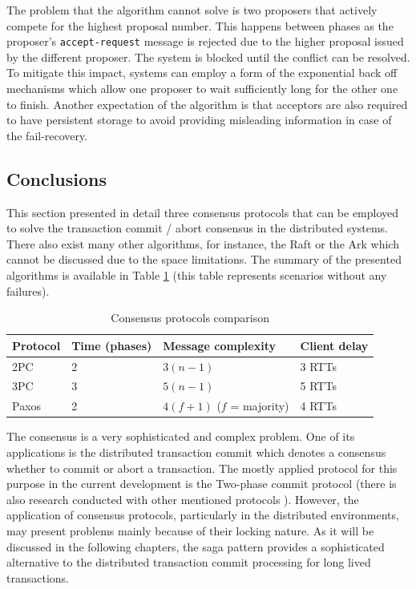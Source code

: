 \documentclass[oneside,
  digital, %
  table,   %
  lof,     %
  lot,     %
]{fithesis3}
\begin{document}
The problem that the algorithm cannot solve is two proposers that actively compete for the highest proposal number. This happens between phases as the proposer's \texttt{accept-request} message is rejected due to the higher proposal issued by the different proposer. The system is blocked until the conflict can be resolved. To mitigate this impact, systems can employ a form of the exponential back off mechanisms which allow one proposer to wait sufficiently long for the other one to finish. Another expectation of the algorithm is that acceptors are also required to have persistent storage to avoid providing misleading information in case of the fail-recovery.

\subsection{Conclusions}

This section presented in detail three consensus protocols that can be employed to solve the transaction commit / abort consensus in the distributed systems. There also exist many other algorithms, for instance, the Raft or the Ark which cannot be discussed due to the space limitations. The summary of the presented algorithms is available in Table \ref{tab:consensus-protocols-comparison} (this table represents scenarios without any failures).

\hfill \break
\begin{table}[h]
    \begin{tabularx}{\textwidth}{lllX}
        \toprule
        Protocol & Time (phases) & Message complexity & Client delay \\
        \midrule
        2PC & 2 & $3(n - 1)$ & 3 RTTs \\
        3PC & 3 & $5(n - 1)$ & 5 RTTs \\
        Paxos & 2 & $4(f + 1)$ ($f$ = majority) & 4 RTTs \\
        \bottomrule
    \end{tabularx}
    \caption{Consensus protocols comparison}
    \label{tab:consensus-protocols-comparison}
\end{table}

The consensus is a very sophisticated and complex problem. One of its applications is the distributed transaction commit which denotes a consensus whether to commit or abort a transaction. The mostly applied protocol for this purpose in the current development is the Two-phase commit protocol \cite{xa_spec, ws-at} (there is also research conducted with other mentioned protocols \cite{paxosTransCommit}). However, the application of consensus protocols, particularly in the distributed environments, may present problems mainly because of their locking nature. As it will be discussed in the following chapters, the saga pattern \cite{sagas_publ} provides a sophisticated alternative to the distributed transaction commit processing for long lived transactions.
\end{document}
